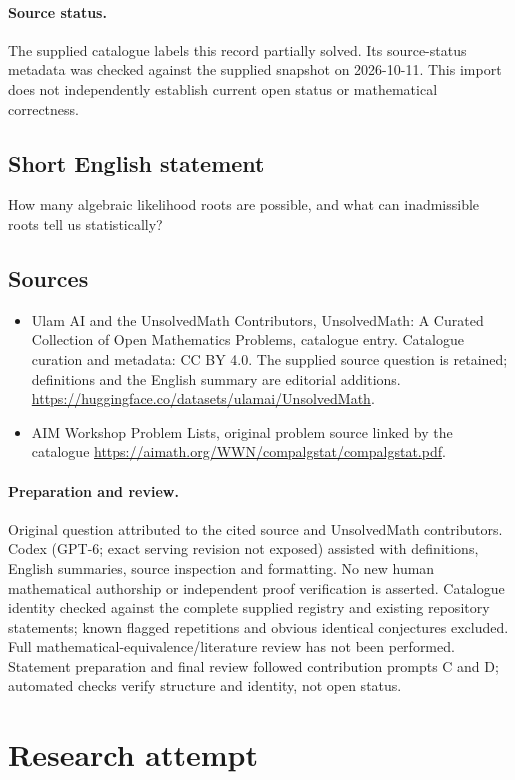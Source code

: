 \documentclass[11pt]{article}
\begin{document}
\paragraph{Source status.}
The supplied catalogue labels this record partially solved. Its source-status metadata was checked against the supplied snapshot on 2026-10-11. This import does not independently establish current open status or mathematical correctness.
\subsection{Short English statement}
How many algebraic likelihood roots are possible, and what can inadmissible roots tell us statistically?
\subsection{Sources}
\begin{itemize}
\item[S1] Ulam AI and the UnsolvedMath Contributors, UnsolvedMath: A Curated Collection of Open Mathematics Problems, catalogue entry. Catalogue curation and metadata: CC BY 4.0. The supplied source question is retained; definitions and the English summary are editorial additions.
\url{https://huggingface.co/datasets/ulamai/UnsolvedMath}.
\item[S2] AIM Workshop Problem Lists, original problem source linked by the catalogue
\url{https://aimath.org/WWN/compalgstat/compalgstat.pdf}.
\end{itemize}
\paragraph{Preparation and review.}
Original question attributed to the cited source and UnsolvedMath contributors. Codex (GPT-6; exact serving revision not exposed) assisted with definitions, English summaries, source inspection and formatting. No new human mathematical authorship or independent proof verification is asserted. Catalogue identity checked against the complete supplied registry and existing repository statements; known flagged repetitions and obvious identical conjectures excluded. Full mathematical-equivalence/literature review has not been performed. Statement preparation and final review followed contribution prompts C and D; automated checks verify structure and identity, not open status.
\label{end:statement}


\section{Research attempt}
\end{document}
